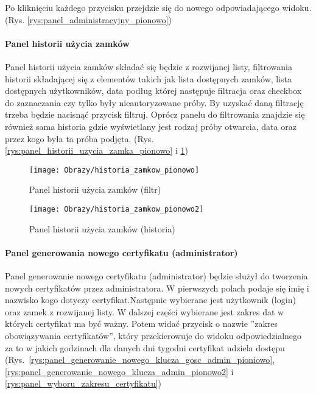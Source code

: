 	Po kliknięciu każdego przycisku przejdzie się do nowego odpowiadającego widoku. (Rys. \ref{rys:panel_administracyjny_pionowo})

\newpage
	
	\paragraph*{Panel historii użycia zamków}
	Panel historii użycia zamków składać się będzie z rozwijanej listy, filtrowania historii składającej się z elementów takich jak lista dostępnych zamków, lista dostępnych użytkowników, data podług której następuje filtracja oraz checkbox do zaznaczania czy tylko były nieautoryzowane próby. By uzyskać daną filtrację trzeba będzie nacisnąć przycisk filtruj. Oprócz panelu do filtrowania znajdzie się również sama historia gdzie wyświetlany jest rodzaj próby otwarcia, data oraz przez kogo była ta próba podjęta. (Rys. \ref{rys:panel_historii_uzycia_zamka_pionowo} i \ref{rys:panel_historii_uzycia_zamka_pionowo2})
	
	\begin{figure}[ht!]
		\begin{minipage}{0.45\textwidth}
			\texttt{[image: Obrazy/historia\_zamkow\_pionowo]}
			\caption{Panel historii użycia zamków (filtr)}
			\label{rys:panel_historii_uzycia_zamka_pionowo}
		\end{minipage}
	\hspace{0.1\textwidth}
		\begin{minipage}{0.45\textwidth}
			\texttt{[image: Obrazy/historia\_zamkow\_pionowo2]}
			\caption{Panel historii użycia zamków (historia)}
			\label{rys:panel_historii_uzycia_zamka_pionowo2}	
		\end{minipage}
	\end{figure}
	\newpage
	
	\paragraph*{Panel generowania nowego certyfikatu (administrator)}
	Panel generowanie nowego certyfikatu (administrator) będzie służył do tworzenia nowych certyfikatów przez administratora. W pierwszych polach podaje się imię i nazwisko kogo dotyczy certyfikat.Następnie wybierane jest użytkownik (login) oraz zamek z rozwijanej listy. W dalszej części wybierane jest zakres dat w których certyfikat ma być ważny. Potem widać przycisk o nazwie ''zakres obowiązywania certyfikatów'', który przekierowuje do widoku odpowiedzialnego za to w jakich godzinach dla danych dni tygodni certyfikat udziela dostępu (Rys.~\ref{rys:panel_generowanie_nowego_klucza_gosc_admin_pioniowo}, \ref{rys:panel_generowanie_nowego_klucza_admin_pionowo2} i 
	\ref{rys:panel_wyboru_zakresu_certyfikatu})
	
